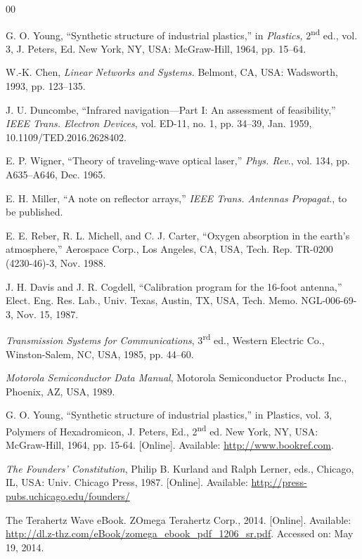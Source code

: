 \documentclass[twoside,web]{ieeecolor}
\begin{document}
\begin{thebibliography}{00}

 G. O. Young, ``Synthetic structure of industrial plastics,'' in \emph{Plastics,} 2\textsuperscript{nd} ed., vol. 3, J. Peters, Ed. New York, NY, USA: McGraw-Hill, 1964, pp. 15--64.

 W.-K. Chen, \emph{Linear Networks and Systems.} Belmont, CA, USA: Wadsworth, 1993, pp. 123--135.

 J. U. Duncombe, ``Infrared navigation---Part I: An assessment of feasibility,'' \emph{IEEE Trans. Electron Devices}, vol. ED-11, no. 1, pp. 34--39, Jan. 1959, 10.1109/TED.2016.2628402.

 E. P. Wigner, ``Theory of traveling-wave optical laser,'' \emph{Phys. Rev}., vol. 134, pp. A635--A646, Dec. 1965.

 E. H. Miller, ``A note on reflector arrays,'' \emph{IEEE Trans. Antennas Propagat}., to be published.

 E. E. Reber, R. L. Michell, and C. J. Carter, ``Oxygen absorption in the earth's atmosphere,'' Aerospace Corp., Los Angeles, CA, USA, Tech. Rep. TR-0200 (4230-46)-3, Nov. 1988.

 J. H. Davis and J. R. Cogdell, ``Calibration program for the 16-foot antenna,'' Elect. Eng. Res. Lab., Univ. Texas, Austin, TX, USA, Tech. Memo. NGL-006-69-3, Nov. 15, 1987.

 \emph{Transmission Systems for Communications}, 3\textsuperscript{rd} ed., Western Electric Co., Winston-Salem, NC, USA, 1985, pp. 44--60.

 \emph{Motorola Semiconductor Data Manual}, Motorola Semiconductor Products Inc., Phoenix, AZ, USA, 1989.

 G. O. Young, ``Synthetic structure of industrial
plastics,'' in Plastics, vol. 3, Polymers of Hexadromicon, J. Peters,
Ed., 2\textsuperscript{nd} ed. New York, NY, USA: McGraw-Hill, 1964, pp. 15-64.
[Online]. Available:
\underline{http://www.bookref.com}.

 \emph{The Founders' Constitution}, Philip B. Kurland
and Ralph Lerner, eds., Chicago, IL, USA: Univ. Chicago Press, 1987.
[Online]. Available: \underline{http://press-pubs.uchicago.edu/founders/}

 The Terahertz Wave eBook. ZOmega Terahertz Corp., 2014.
[Online]. Available:
\underline{http://dl.z-thz.com/eBook/zomega\_ebook\_pdf\_1206\_sr.pdf}. Accessed on: May 19, 2014.


\end{thebibliography}
\end{document}
